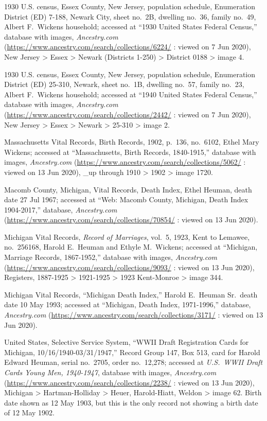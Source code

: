\begin{thebibliography}{999}
1930 U.S. census, Essex County, New Jersey, population schedule, Enumeration District (ED) 7-188, Newark City, sheet no.\ 2B, dwelling no.\ 36, family no.\ 49, Albert F.\ Wickens household; accessed at ``1930 United States Federal Census,'' database with images, \textit{Ancestry.com} (\url{https://www.ancestry.com/search/collections/6224/} : viewed on 7 Jun 2020), New Jersey > Essex > Newark (Districts 1-250) > District 0188 > image 4.

1930 U.S. census, Essex County, New Jersey, population schedule, Enumeration District (ED) 25-310, Newark, sheet no.\ 1B, dwelling no.\ 57, family no.\ 23, Albert F.\ Wickens household; accessed at ``1940 United States Federal Census,'' database with images, \textit{Ancestry.com} (\url{https://www.ancestry.com/search/collections/2442/} : viewed on 7 Jun 2020), New Jersey > Essex > Newark > 25-310 > image 2.


Massachusetts Vital Records, Birth Records, 1902, p.\ 136, no.\ 6102, Ethel Mary Wickens; accessed at ``Massachusetts, Birth Records, 1840-1915,'' database with images, \textit{Ancestry.com} (\url{https://www.ancestry.com/search/collections/5062/} : viewed on 13 Jun 2020), \_up through 1910 > 1902 > image 1720.

Macomb County, Michigan, Vital Records, Death Index, Ethel Heuman, death date 27 Jul 1967; accessed at ``Web: Macomb County, Michigan, Death Index 1904-2017,'' database, \textit{Ancestry.com} (\url{https://www.ancestry.com/search/collections/70854/} : viewed on 13 Jun 2020).

Michigan Vital Records, \textit{Record of Marriages}, vol.\ 5, 1923, Kent to Lemawee, no.\ 256168, Harold E.\ Heuman and Ethyle M.\ Wickens; accessed at ``Michigan, Marriage Records, 1867-1952,'' database with images, \textit{Ancestry.com} (\url{https://www.ancestry.com/search/collections/9093/} : viewed on 13 Jun 2020),  Registers, 1887-1925 > 1921-1925 > 1923 Kent-Monroe > image 344.

Michigan Vital Records, ``Michigan Death Index,'' Harold E.\ Heuman Sr.\, death date 10 May 1993; accessed at ``Michigan, Death Index, 1971-1996,'' database, \textit{Ancestry.com} (\url{https://www.ancestry.com/search/collections/3171/} : viewed on 13 Jun 2020).

United States, Selective Service System, ``WWII Draft Registration Cards for Michigan, 10/16/1940-03/31/1947,'' Record Group 147, Box 513, card for Harold Edward Heuman, serial no.\ 2705, order no.\ 12,278; accessed at \textit{U.S.\ WWII Draft Cards Young Men, 1940-1947}, database with images, \textit{Ancestry.com} (\url{https://www.ancestry.com/search/collections/2238/} : viewed on 13 Jun 2020), Michigan > Hartman-Holliday > Heuer, Harold-Hiatt, Weldon > image 62.
Birth date shown as 12 May 1903, but this is the only record not showing a birth date of 12 May 1902.


\end{thebibliography}
